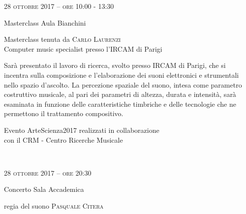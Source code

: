 
\begin{flushleft}

\large{
	\scshape{
	28 ottobre 2017 -- ore 10:00 - 13:30
	}}

\medskip
	
\small{Masterclass
	\newline Aula Bianchini}

\medskip

{\fontsize{20}{20} }

\normalfont

\normalsize

\bigskip

Masterclass tenuta da \textsc{Carlo Laurenzi}\\{\footnotesize Computer music specialist presso l'IRCAM di Parigi}


\bigskip

Sarà presentato il lavoro di ricerca, svolto presso IRCAM di Parigi, che si incentra sulla composizione e l’elaborazione dei suoni elettronici e strumentali nello spazio d’ascolto. La percezione spaziale del suono, intesa come parametro costruttivo musicale, al pari dei parametri di altezza, durata e intensità, sarà esaminata in funzione delle caratteristiche timbriche e delle tecnologie che ne permettono il trattamento compositivo.

\bigskip

\small{Evento ArteScienza2017 realizzati in collaborazione\\con il CRM - Centro Ricerche Musicale}

~\vfill



\large{
	\scshape{
	28 ottobre 2017 -- ore 20:30
	}}

\medskip
	
\small{Concerto
	\newline Sala Accademica}

\medskip

{\fontsize{20}{20} }

\medskip

{\fontsize{40}{40} }

\normalsize

\medskip

regia del suono \textsc{Pasquale Citera}


\end{flushleft}
